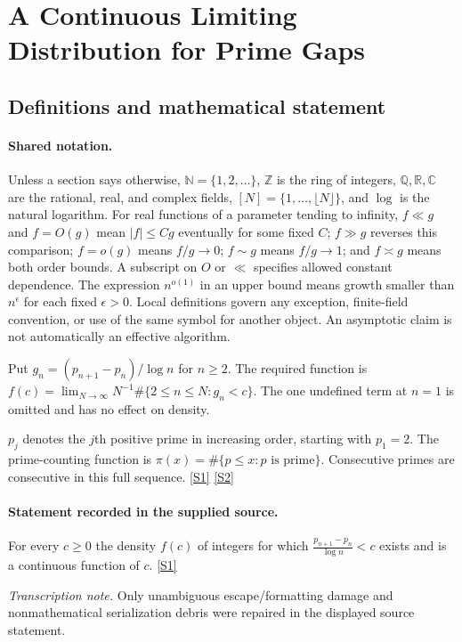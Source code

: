 \documentclass[11pt,a4paper]{article}
\newcommand{\N}{\mathbb{N}}
\newcommand{\Z}{\mathbb{Z}}
\newcommand{\Q}{\mathbb{Q}}
\newcommand{\R}{\mathbb{R}}
\newcommand{\C}{\mathbb{C}}
\newcommand{\sref}[2]{\hyperlink{source:#1:#2}{[S#2]}}
\begin{document}
\section{A Continuous Limiting Distribution for Prime Gaps}\label{statement}


\subsection{Definitions and mathematical statement}

\paragraph{Shared notation.}Unless a section says otherwise, $\N=\{1,2,\ldots\}$,
$\Z$ is the ring of integers, $\Q,\R,\C$ are the rational, real, and complex
fields, $[N]=\{1,\ldots,\lfloor N\rfloor\}$, and $\log$ is the natural
logarithm. For real functions of a parameter tending to infinity,
$f\ll g$ and $f=O(g)$ mean $|f|\leq Cg$ eventually for some fixed $C$;
$f\gg g$ reverses this comparison; $f=o(g)$ means $f/g\to0$;
$f\sim g$ means $f/g\to1$; and $f\asymp g$ means both order bounds.
A subscript on $O$ or $\ll$ specifies allowed constant dependence.
The expression $n^{o(1)}$ in an upper bound means growth smaller than
$n^\epsilon$ for each fixed $\epsilon>0$. Local definitions govern any
exception, finite-field convention, or use of the same symbol for another
object. An asymptotic claim is not automatically an effective algorithm.



Put $g_n=(p_{n+1}-p_n)/\log n$ for $n\geq2$. The required function is $f(c)=\lim_{N\to\infty}N^{-1}\#\{2\leq n\leq N:g_n<c\}$. The one undefined term at $n=1$ is omitted and has no effect on density.

$p_j$ denotes the $j$th positive prime in increasing order, starting with $p_1=2$. The prime-counting function is $\pi(x)=\#\{p\leq x:p\text{ is prime}\}$. Consecutive primes are consecutive in this full sequence. \sref{statement}{1} \sref{statement}{2}

\paragraph{Statement recorded in the supplied source.}
For every $c\geq 0$ the density $f(c)$ of integers for which $ \frac{p_{n+1}-p_n}{\log n}< c $ exists and is a continuous function of $c$. \sref{statement}{1}

{\small\emph{Transcription note.} Only unambiguous escape/formatting damage and nonmathematical serialization debris were repaired in the displayed source statement.}
\end{document}
